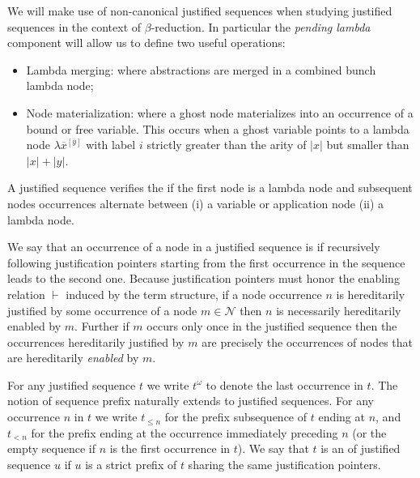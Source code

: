 \documentclass{elsarticle}
\theoremstyle{plain}
\theoremstyle{definition}
\theoremstyle{remark}
\newcommand\Nodes{\mathcal{N}}%
\newcommand{\ghostvar}{\theta}
\newcommand{\enables}{\vdash} %
\begin{document}
We will make use of non-canonical justified sequences when studying
justified sequences in the context of $\beta$-reduction. In particular the \emph{pending lambda} component will allow us to define two useful operations:
\begin{itemize}
    \item Lambda merging: where abstractions are merged in a combined bunch lambda node;
    \item Node materialization: where a ghost node materializes into an occurrence of a bound or free variable. This occurs when a ghost variable points to a lambda node $\lambda\overline{x}^{[\overline{y}]}$ with label $i$ strictly greater than the arity of $|x|$ but smaller than $|x|+|y|$.
\end{itemize}


A justified sequence verifies the  if the first node is a lambda node and subsequent nodes occurrences alternate between (i) a variable or application node (ii) a lambda node.

We say that an occurrence of a node in a justified sequence is  if recursively following justification pointers starting from the first occurrence in the sequence leads to the second one. Because justification pointers must honor the enabling relation $\enables$ induced by the term structure, if a node occurrence $n$ is hereditarily justified by some occurrence of a node $m\in\Nodes$ then $n$ is necessarily hereditarily enabled by $m$. Further if $m$ occurs only once in the justified sequence then the occurrences hereditarily justified by $m$ are precisely the occurrences of nodes that are hereditarily \emph{enabled} by $m$.

For any justified sequence $t$ we write $t^\omega$ to denote the last occurrence in $t$. The notion of sequence prefix naturally extends to justified sequences.
For any occurrence $n$ in $t$ we write $t_{\leq n}$ for the prefix subsequence of $t$ ending at $n$, and $t_{<n}$ for the prefix ending at the occurrence immediately preceding $n$ (or the empty sequence if $n$ is the first occurrence in $t$).
 We say that $t$ is an  of justified sequence $u$ if $u$ is a strict prefix of $t$ sharing the same justification pointers.
\end{document}
